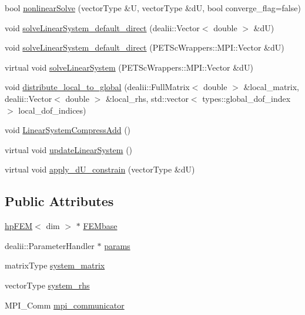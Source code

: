 \begin{DoxyCompactItemize}
\item 
bool \hyperlink{classsolve_class_ae8689a33a3a9ed36b59529c53527c5f9}{nonlinear\-Solve} (vector\-Type \&U, vector\-Type \&d\-U, bool converge\-\_\-flag=false)
\item 
void \hyperlink{classsolve_class_aaed39c6902f1e1de684583e56fb14f66}{solve\-Linear\-System\-\_\-default\-\_\-direct} (dealii\-::\-Vector$<$ double $>$ \&d\-U)
\item 
void \hyperlink{classsolve_class_ac888eaa37061db46d24d90065b733a82}{solve\-Linear\-System\-\_\-default\-\_\-direct} (P\-E\-T\-Sc\-Wrappers\-::\-M\-P\-I\-::\-Vector \&d\-U)
\item 
virtual void \hyperlink{classsolve_class_a31c22340527a596f8d6aeeea60ffe52a}{solve\-Linear\-System} (P\-E\-T\-Sc\-Wrappers\-::\-M\-P\-I\-::\-Vector \&d\-U)
\item 
void \hyperlink{classsolve_class_af9e8a3e1a38280c43f242bbeb7139f00}{distribute\-\_\-local\-\_\-to\-\_\-global} (dealii\-::\-Full\-Matrix$<$ double $>$ \&local\-\_\-matrix, dealii\-::\-Vector$<$ double $>$ \&local\-\_\-rhs, std\-::vector$<$ types\-::global\-\_\-dof\-\_\-index $>$ local\-\_\-dof\-\_\-indices)
\item 
void \hyperlink{classsolve_class_ad7659997bee5e782a6eaa46db001b66a}{Linear\-System\-Compress\-Add} ()
\item 
virtual void \hyperlink{classsolve_class_af78c2c6284234c93872188334fb997d8}{update\-Linear\-System} ()
\item 
virtual void \hyperlink{classsolve_class_a029ece57f667fa697cb29eb482eff31b}{apply\-\_\-d\-U\-\_\-constrain} (vector\-Type \&d\-U)
\end{DoxyCompactItemize}
\subsection*{Public Attributes}
\begin{DoxyCompactItemize}
\item 
\hyperlink{classhp_f_e_m}{hp\-F\-E\-M}$<$ dim $>$ $\ast$ \hyperlink{classsolve_class_a46118a342b07ce7167bb0c9358de84f1}{F\-E\-Mbase}
\item 
dealii\-::\-Parameter\-Handler $\ast$ \hyperlink{classsolve_class_accca5aede13ea52f0c11dff4daf1ad97}{params}
\item 
matrix\-Type \hyperlink{classsolve_class_a56f7357eb335f9ce4ac30bc30d7513e8}{system\-\_\-matrix}
\item 
vector\-Type \hyperlink{classsolve_class_a6c39fa839fdc40d2408946617a778571}{system\-\_\-rhs}
\item 
M\-P\-I\-\_\-\-Comm \hyperlink{classsolve_class_a03728ed636ca889ae407c84d181bc611}{mpi\-\_\-communicator}
\end{DoxyCompactItemize}


